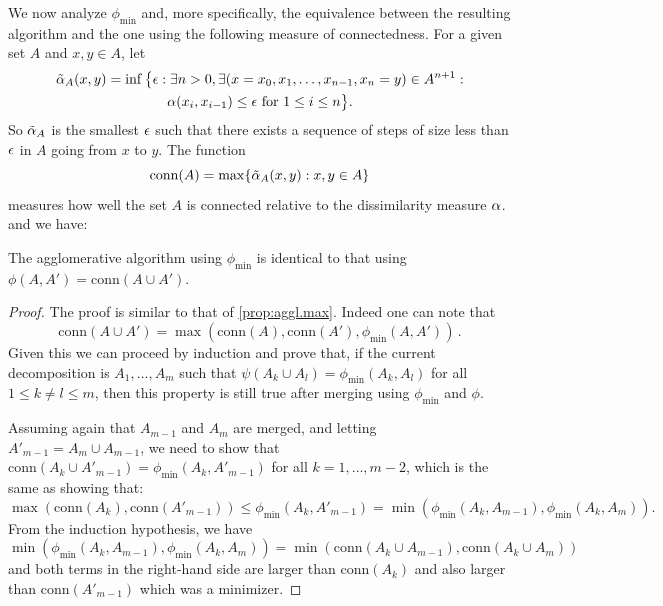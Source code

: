\bigskip
We now analyze $\phi_{\min}$ and, more specifically, the equivalence between the resulting algorithm and the one using the following measure of connectedness.  For a given set $A$ and $x,y\in A$, let 
\begin{multline*}
\tilde {\alpha}_A(x,y) = \inf\big\{\epsilon: \exists n>0, \exists (x=x_0, x_1, \ldots, x_{n-1}, x_n=y) \in A^{n+1}:\\ \alpha(x_i, x_{i-1})\leq \epsilon \text{ for } 1\leq i \leq n\big\}.
\end{multline*}
So $\tilde {\alpha}_A$ is the smallest $\epsilon$ such that there exists a sequence of steps of size less than $\epsilon$ in $A$ going from $x$ to $y$. The function 
\[
\mathrm{conn}(A) = \max\{\tilde{\alpha}_A(x,y):x,y\in A\}
\]
measures how well the set $A$ is connected relative to the dissimilarity measure $\alpha$. and we have: 
\begin{proposition}
\label{prop:aggl.min}
The agglomerative algorithm using $\phi_{\min}$ is identical to that using $\phi(A,A') = \mathrm{conn}(A\cup A')$.
\end{proposition}
\begin{proof}
The proof is similar to that of \cref{prop:aggl.max}. Indeed one can note  that 
\[
\mathrm{conn}(A\cup A') = \max(\mathrm{conn}(A), \mathrm{conn}(A'), \phi_{\min}(A,A'))\,.
\]
Given this we can proceed by induction and prove that, if the current decomposition is   $A_1, \ldots, A_m$ such that $\psi(A_k \cup A_l)  = \phi_{\min}(A_k,  A_l)$ for all $1 \leq k\neq l \leq m$, then this property is still true after merging using $\phi_{\min}$ and $\phi$.

Assuming again that $A_{m-1}$ and $A_m$ are merged, and letting $A'_{m-1} = A_m \cup A_{m-1}$, we need to show that $\mathrm{conn}(A_k \cup A'_{m-1})  = \phi_{\min}(A_k,  A'_{m-1})$ for all $k=1, \ldots, m-2$, which is the same as showing that:
\[
\max(\mathrm{conn}(A_k), \mathrm{conn}(A'_{m-1})) \leq \phi_{\min}(A_k,  A'_{m-1}) = \min(\phi_{\min}(A_k,  A_{m-1}), \phi_{\min}(A_k,  A_{m})).
\]
From the induction hypothesis, we have
\[
\min(\phi_{\min}(A_k,  A_{m-1}), \phi_{\min}(A_k,  A_{m})) = \min(\mathrm{conn}(A_k \cup A_{m-1}), \mathrm{conn}(A_k \cup  A_{m}))
\]
and both terms in the right-hand side are larger than $\mathrm{conn}(A_k)$ and also larger than $\mathrm{conn}(A'_{m-1})$ which was a minimizer.
\end{proof}




